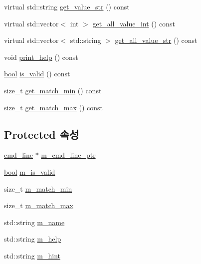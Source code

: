 \begin{DoxyCompactItemize}
virtual std\+::string \hyperlink{classcli__argument_a30924e54bc1df74cadc22e90d43c0124}{get\+\_\+value\+\_\+str} () const 
\item 
virtual std\+::vector$<$ int $>$ \hyperlink{classcli__argument_a714bede99fe9cb950c3c93e81cb96074}{get\+\_\+all\+\_\+value\+\_\+int} () const 
\item 
virtual std\+::vector$<$ std\+::string $>$ \hyperlink{classcli__argument_a3db4f59a61184261b69eb347d37ee066}{get\+\_\+all\+\_\+value\+\_\+str} () const 
\item 
void \hyperlink{classcli__argument_a695407d45700941d937b4c11c6b140d1}{print\+\_\+help} () const 
\item 
\hyperlink{avb__gptp_8h_af6a258d8f3ee5206d682d799316314b1}{bool} \hyperlink{classcli__argument_a73e929d29381f1d792af13350b79222c}{is\+\_\+valid} () const 
\item 
size\+\_\+t \hyperlink{classcli__argument_a513ea3e90c4e9f5f32dbb57b4e989280}{get\+\_\+match\+\_\+min} () const 
\item 
size\+\_\+t \hyperlink{classcli__argument_abc7abd92891ff2380bbaf15b99eb6394}{get\+\_\+match\+\_\+max} () const 
\end{DoxyCompactItemize}
\subsection*{Protected 속성}
\begin{DoxyCompactItemize}
\item 
\hyperlink{classcmd__line}{cmd\+\_\+line} $\ast$ \hyperlink{classcli__argument_a802ef904236d4228f1b8edb3a96eb9cd}{m\+\_\+cmd\+\_\+line\+\_\+ptr}
\item 
\hyperlink{avb__gptp_8h_af6a258d8f3ee5206d682d799316314b1}{bool} \hyperlink{classcli__argument_a3163252d457c8ef3a286a8538d7e319f}{m\+\_\+is\+\_\+valid}
\item 
size\+\_\+t \hyperlink{classcli__argument_a9e9208481670105577821d0a1aee5179}{m\+\_\+match\+\_\+min}
\item 
size\+\_\+t \hyperlink{classcli__argument_a6f9fd009acee86b73a9f1b8e80a95b43}{m\+\_\+match\+\_\+max}
\item 
std\+::string \hyperlink{classcli__argument_adb41893ba19e889e56c559f25fc1a68a}{m\+\_\+name}
\item 
std\+::string \hyperlink{classcli__argument_a3985971d45415a337f60ed183b445c96}{m\+\_\+help}
\item 
std\+::string \hyperlink{classcli__argument_a3feeeba99be6bb94b8fa0ebc88ef09cf}{m\+\_\+hint}
\end{DoxyCompactItemize}
